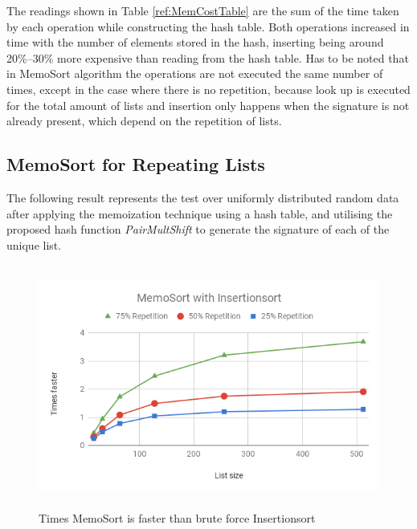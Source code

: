 \documentclass[a4paper,12pt]{article}
\begin{document}
The readings shown in Table \ref{ref:MemCostTable} are the sum of the time taken by each operation while constructing the hash table. Both operations increased in time with the number of elements stored in the hash, inserting being around 20\%--30\% more expensive than reading from the hash table. Has to be noted that in MemoSort algorithm the operations are not executed the same number of times, except in the case where there is no repetition, because look up is executed for the total amount of lists and insertion only happens when the signature is not  already present, which depend on the repetition of lists.

\subsection{MemoSort for Repeating Lists}

The following result represents the test over uniformly distributed random data after applying the memoization technique using a hash table, and utilising the proposed hash function {\it PairMultShift}  to generate the signature of each of the unique list. \\

\begin{figure}[H]
    \centering
    \includegraphics[height=8cm,keepaspectratio]{./images/MemoSortIns.png}
    \caption{Times MemoSort is faster than brute force Insertionsort }
    \label{fig:MemoSortInsGraph}
\end{figure}
\end{document}
